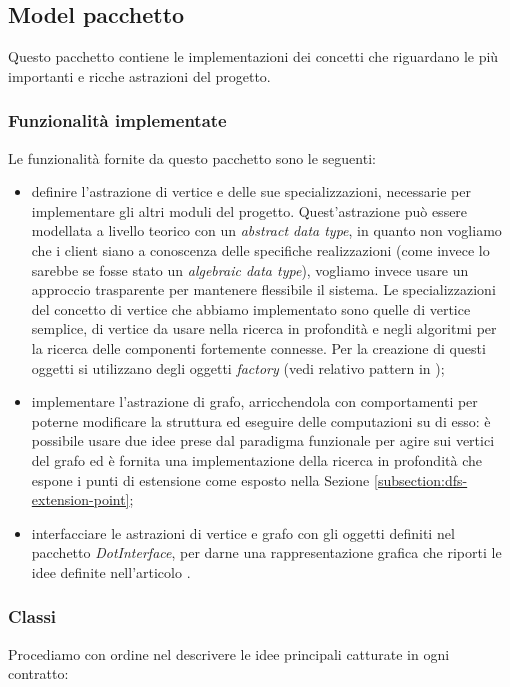 \subsection{Model pacchetto}
\label{subsection:model-package-description}
Questo pacchetto contiene le implementazioni dei concetti che riguardano
le pi\`u importanti e ricche astrazioni del progetto.

\subsubsection*{Funzionalit\`a implementate}
\label{subsection:model-supplied-abstractions}
Le funzionalit\`a fornite da questo pacchetto sono le seguenti:
\begin{itemize}
\label{itemize:model-supplied-abstraction}
\item definire l'astrazione di vertice e delle sue specializzazioni,
  necessarie per implementare gli altri moduli del
  progetto. Quest'astrazione pu\`o essere modellata a livello teorico
  con un \emph{abstract data type}, in quanto non vogliamo che i
  client siano a conoscenza delle specifiche realizzazioni (come
  invece lo sarebbe se fosse stato un \emph{algebraic data type}),
  vogliamo invece usare un approccio trasparente per mantenere
  flessibile il sistema. Le specializzazioni del concetto di vertice
  che abbiamo implementato sono quelle di vertice semplice, di vertice
  da usare nella ricerca in profondit\`a e negli algoritmi per la
  ricerca delle componenti fortemente connesse. Per la creazione di
  questi oggetti si utilizzano degli oggetti \emph{factory} (vedi
  relativo pattern in \cite{SmalltalkCompanion98});
\item implementare l'astrazione di grafo, arricchendola con
  comportamenti per poterne modificare la struttura ed eseguire delle
  computazioni su di esso: \`e possibile usare due idee prese dal
  paradigma funzionale per agire sui vertici del grafo ed \`e fornita
  una implementazione della ricerca in profondit\`a che espone i punti
  di estensione come esposto nella Sezione
  \ref{subsection:dfs-extension-point};
\item interfacciare le astrazioni di vertice e grafo con gli oggetti
  definiti nel pacchetto \emph{DotInterface}, per darne una
  rappresentazione grafica che riporti le idee definite nell'articolo
  \cite{tellingStories}.
\end{itemize}

\subsubsection*{Classi}
Procediamo con ordine nel descrivere le idee principali catturate in
ogni contratto:

